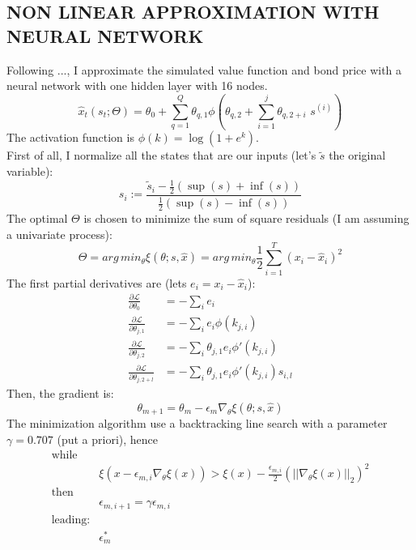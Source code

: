 \documentclass[11pt, a4paper]{article}
\theoremstyle{definition}
\begin{document}
	\subsection{NON LINEAR APPROXIMATION WITH NEURAL NETWORK}
	Following ..., I approximate the simulated value function and bond price with a neural network with one hidden layer with 16 nodes.
	\begin{equation}
		\hat{x}_t(s_t;\Theta) = \theta_0 + \sum_{q=1}^{Q} \theta_{q,1} \phi\left(\theta_{q,2}+\sum_{i=1}^{j}\theta_{q,2+i} \,\,s^{(i)}\right)
	\end{equation}
	The activation function is $\phi(k) = \log\left(1+e^{k}\right)$.\\
	First of all, I normalize all the states that are our inputs (let's $\tilde s$ the original variable):
	\begin{equation*}
		s_i := \frac{\tilde s_i - \frac{1}{2}(\sup(s)+\inf(s))}{\frac{1}{2}(\sup(s)-\inf(s))}	
	\end{equation*}
	The optimal $\Theta$ is chosen to minimize the sum of square residuals (I am assuming a univariate process):
	\begin{equation}
		\Theta =arg\,min_{\theta}\xi(\theta; s,\hat x) = arg\,min_{\theta}\frac{1}{2}\sum_{i=1}^{T}(x_i-\hat{x}_i)^2
	\end{equation}
	The first partial derivatives are (lets $e_i = x_i - \hat x_i$):
	\begin{align}
		\frac{\partial \mathcal{L}}{\partial \theta_0} &= -\sum_i e_i \\
		\frac{\partial \mathcal{L}}{\partial \theta_{j,1}} &= -\sum_i e_i \phi(k_{j,i}) \\
		\frac{\partial \mathcal{L}}{\partial \theta_{j,2}} &= -\sum_i \theta_{j,1} e_i \phi'(k_{j,i}) \\	
		\frac{\partial \mathcal{L}}{\partial \theta_{j,2+l}} &= -\sum_i \theta_{j,1} e_i \phi'(k_{j,i})s_{i,l}				
	\end{align}
	Then, the gradient is:
	\begin{equation}
		\theta_{m+1} = \theta_m - \epsilon_m \nabla_{\theta} \xi(\theta; s,\hat x)
	\end{equation}
	The minimization algorithm use a backtracking line search with a parameter $\gamma = 0.707$ (put a priori), hence
	\begin{align*}
		\text{while}&\\
		&\xi(x -\epsilon_{m,i}\nabla_\theta \xi(x))> \xi(x) - \frac{\epsilon_{m,i}}{2}\left(||\nabla_\theta \xi(x)||_2 \right)^2\\
		\text{then}&\\
		& \epsilon_{m, i+1} = \gamma \epsilon_{m,i} \\
		\text{leading:}&\\
		& \epsilon_{m}^* 
	\end{align*}
\end{document}
